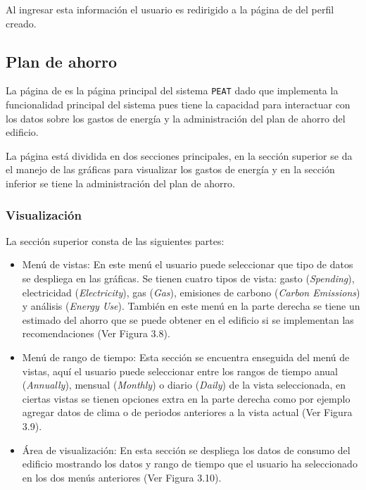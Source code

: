 Al ingresar esta información el usuario es redirigido a la página de
 del perfil creado.

\subsection{Plan de ahorro}

La página de  es la página principal del sistema
\texttt{PEAT} dado que implementa la funcionalidad principal del sistema
pues tiene la capacidad para interactuar con los datos sobre los gastos de
energía y la administración del plan de ahorro del edificio.

La página está dividida en dos secciones principales, en la sección superior
se da el manejo de las gráficas para visualizar los gastos de energía y en la
sección inferior se tiene la administración del plan de ahorro.

\subsubsection{Visualización}

La sección superior consta de las siguientes partes:
\begin{itemize}
\item Menú de vistas: En este menú el usuario puede seleccionar
  que tipo de datos se despliega en las gráficas. Se tienen cuatro tipos
  de vista: gasto (\textit{Spending}), electricidad (\textit{Electricity}), gas
  (\textit{Gas}), emisiones de carbono (\textit{Carbon Emissions}) y análisis
  (\textit{Energy Use}). También en este menú en la parte derecha se
  tiene un estimado del ahorro que se puede obtener en el edificio
  si se implementan las recomendaciones (Ver Figura 3.8).
\item Menú de rango de tiempo: Esta sección se encuentra enseguida del menú de
  vistas, aquí el usuario puede seleccionar entre los rangos de tiempo anual
  (\textit{Annually}), mensual (\textit{Monthly}) o diario (\textit{Daily}) de la
  vista seleccionada, en ciertas vistas se tienen opciones extra en la parte
  derecha como por ejemplo agregar datos de clima o de periodos anteriores
  a la vista actual (Ver Figura 3.9).
\item Área de visualización: En esta sección se despliega los datos de consumo
  del edificio mostrando los datos y rango de tiempo que el usuario ha seleccionado
  en los dos menús anteriores (Ver Figura 3.10).
\end{itemize}

